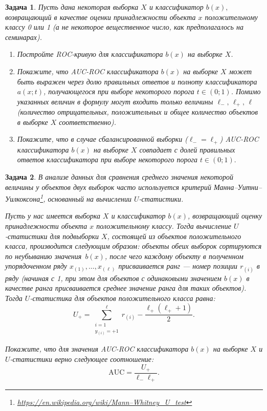 \documentclass[12pt,fleqn]{article}
\newtheorem{esProblem}{Задача}
\begin{document}
\begin{esProblem}
	Пусть дана некоторая выборка $X$ и классификатор $b(x),$ возвращающий в качестве оценки принадлежности объекта  $x$ положительному классу 0 или 1 (а не некоторое вещественное число, как предполагалось на семинарах).
	\begin{enumerate}
	\item
	Постройте ROC-кривую для классификатора $b(x)$ на выборке $X$.
	\item
	Покажите, что AUC-ROC классификатора $b(x)$ на выборке $X$ может быть выражен через долю правильных ответов и полноту классификатора $a(x; t)$, получающегося при выборе некоторого порога $t \in (0; 1)$. Помимо указанных величин в формулу могут входить только величины $\ell_-, \, \ell_+, \, \ell$ (количество отрицательных, положительных и общее количество объектов в выборке  $X$ соответственно).
	\item
	Покажите, что в случае сбалансированной выборки ($\ell_- = \ell_+$) AUC-ROC классификатора $b(x)$ на выборке $X$ совпадает с долей правильных ответов классификатора при выборе некоторого порога $t \in (0;1).$
	\end{enumerate} 
\end{esProblem}

\begin{esProblem}
	В анализе данных для сравнения среднего значения некоторой величины у объектов двух выборок часто используется критерий Манна–Уитни–Уилкоксона\footnote{\href{https://en.wikipedia.org/wiki/Mann\%2dWhitney\_U\_test}{https://en.wikipedia.org/wiki/Mann–Whitney\_U\_test}}, основанный на вычислении $U$-статистики.
	\par Пусть у нас имеется выборка $X$ и классификатор $b(x)$, возвращающий оценку принадлежности объекта $x$ положительному классу. Тогда вычисление $U$-статистики для подвыборки $X$, состоящей из объектов положительного класса, производится следующим образом: объекты обеих выборок сортируются по неубыванию значения~$b(x)$, после чего каждому объекту в полученном упорядоченном ряду $x_{(1)}, \dots, x_{(\ell)}$ присваивается ранг — номер позиции $r_{(i)}$ в ряду (начиная с 1, при этом для объектов с одинаковыми значением $b(x)$ в качестве ранга присваивается среднее значение ранга для таких объектов). Тогда $U$-статистика для объектов положительного класса равна:
	$$U_+ = \sum_{\substack{i= 1 \\ y_{(i)} = +1}}^\ell r_{(i)} - \frac{\ell_+ (\ell_+ + 1)}{2}.$$
	\par Покажите, что для значения AUC-ROC классификатора $b(x)$ на выборке $X$ и $U$-статистики верно следующее соотношение:
	$$\text{AUC} = \frac{U_+}{\ell_- \ell_+}.$$
	
\end{esProblem}
\end{document}
